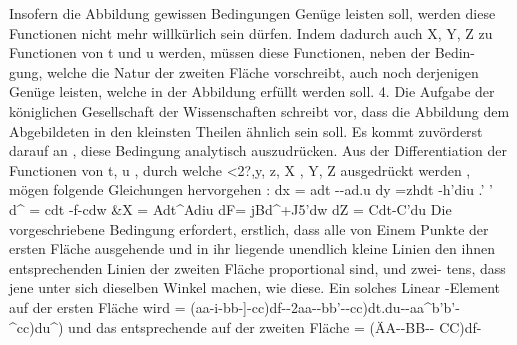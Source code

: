 \documentclass[12pt,a4paper]{article}
\begin{document}
Insofern die Abbildung gewissen Bedingungen Genüge leisten soll, werden diese
Functionen nicht mehr willkürlich sein dürfen. Indem dadurch auch X, Y, Z
zu Functionen von t und u werden, müssen diese Functionen, neben der Bedin-
gung, welche die Natur der zweiten Fläche vorschreibt, auch noch derjenigen
Genüge leisten, welche in der Abbildung erfüllt werden soll.
4.
Die Aufgabe der königlichen Gesellschaft der Wissenschaften schreibt vor,
dass die Abbildung dem Abgebildeten in den kleinsten Theilen ähnlich sein soll.
Es kommt zuvörderst darauf an , diese Bedingung analytisch auszudrücken.
Aus der Differentiation der Functionen von t, u , durch welche <2?,y, z, X , Y, Z
ausgedrückt werden , mögen folgende Gleichungen hervorgehen :
dx = adt -{-ad.u
dy =zhdt -\-h'diu
.' ' d^ = cdt -f-cdw
&X = Adt^Adiu
dF= jBd^+J5'dw
dZ = Cdt-\-C'du
Die vorgeschriebene Bedingung erfordert, erstlich, dass alle von Einem
Punkte der ersten Fläche ausgehende und in ihr liegende unendlich kleine Linien
den ihnen entsprechenden Linien der zweiten Fläche proportional sind, und zwei-
tens, dass jene unter sich dieselben Winkel machen, wie diese.
Ein solches Linear -Element auf der ersten Fläche wird
= \/({aa-i-bb-]-cc)df-}-2{aa-{-bb'-}-cc)dt.du-{-{aa^b'b'-^cc)du^)
und das entsprechende auf der zweiten Fläche
= \/({ÄA-}-BB-{- CC)df-}}}}}
\end{document}
